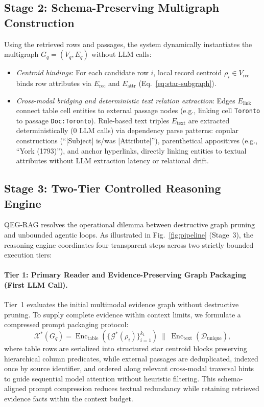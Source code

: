 \documentclass[runningheads]{llncs}
\begin{document}
\enlargethispage{2.5\baselineskip}
\subsection{Stage 2: Schema-Preserving Multigraph Construction}
\label{sec:method-kg}
Using the retrieved rows and passages, the system dynamically instantiates the multigraph $G_q=(V_q, E_q)$ without LLM calls:
\begin{itemize}[leftmargin=1.5em]
    \item \emph{Centroid bindings}: For each candidate row $i$, local record centroid $\rho_i \in V_{\text{rec}}$ binds row attributes via $E_{\text{rec}}$ and $E_{\text{attr}}$ (Eq.~\ref{eq:star-subgraph}).
    \item \emph{Cross-modal bridging and deterministic text relation extraction}: Edges $E_{\text{link}}$ connect table cell entities to external passage nodes (e.g., linking cell \texttt{Toronto} to passage \texttt{Doc:Toronto}). Rule-based text triples $E_{\text{text}}$ are extracted deterministically (0 LLM calls) via dependency parse patterns: copular constructions (``[Subject] is/was [Attribute]''), parenthetical appositives (e.g., ``York (1793)''), and anchor hyperlinks, directly linking entities to textual attributes without LLM extraction latency or relational drift.
\end{itemize}

\subsection{Stage 3: Two-Tier Controlled Reasoning Engine}
\label{sec:method-engine}


QEG-RAG resolves the operational dilemma between destructive graph pruning and unbounded agentic loops. As illustrated in Fig.~\ref{fig:pipeline} (Stage~3), the reasoning engine coordinates four transparent steps across two strictly bounded execution tiers:

\paragraph{Tier 1: Primary Reader and Evidence-Preserving Graph Packaging (First LLM Call).}
Tier~1 evaluates the initial multimodal evidence graph without destructive pruning. To supply complete evidence within context limits, we formulate a compressed prompt packaging protocol:
\begin{equation}
\label{eq:compression}
\mathcal{X}^*(G_q) = \operatorname{Enc}_{\text{table}}\left(\{\mathcal{G}^*(\rho_i)\}_{i=1}^{k_1}\right) \;\parallel\; \operatorname{Enc}_{\text{text}}(\mathcal{D}_{\text{unique}}),
\end{equation}
where table rows are serialized into structured star centroid blocks preserving hierarchical column predicates, while external passages are deduplicated, indexed once by source identifier, and ordered along relevant cross-modal traversal hints to guide sequential model attention without heuristic filtering. This schema-aligned prompt compression reduces textual redundancy while retaining retrieved evidence facts within the context budget.
\end{document}
